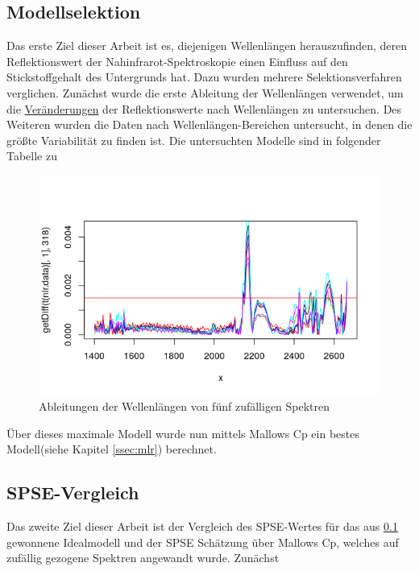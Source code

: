 	\subsection{Modellselektion}
	\label{ssec:modellselektion}
	Das erste Ziel dieser Arbeit ist es, diejenigen Wellenlängen herauszufinden, deren Reflektionswert der Nahinfrarot-Spektroskopie einen Einfluss auf den Stickstoffgehalt des Untergrunds hat. Dazu wurden mehrere Selektionsverfahren verglichen. Zunächst wurde die erste Ableitung der Wellenlängen verwendet, um die \underline{Veränderungen} der Reflektionswerte nach Wellenlängen zu untersuchen. Des Weiteren wurden die Daten nach Wellenlängen-Bereichen untersucht, in denen die größte Variabilität zu finden ist. Die untersuchten Modelle sind in folgender Tabelle zu 
	\begin{table}
		
	\end{table}
	
	
	\begin{figure}
		\label{Wellenlängen_erste_Ableitung}
		\includegraphics[width=\textwidth]{img/wave_1dev.png}
		\caption{Ableitungen der Wellenlängen von fünf zufälligen Spektren}
	\end{figure}
	Über dieses maximale Modell wurde nun mittels Mallows Cp ein bestes Modell(siehe Kapitel \ref{ssec:mlr}) berechnet.
	
	\subsection{SPSE-Vergleich}
	Das zweite Ziel dieser Arbeit ist der Vergleich des SPSE-Wertes für das aus \ref{ssec:modellselektion} gewonnene Idealmodell und der SPSE Schätzung über Mallows Cp, welches auf zufällig gezogene Spektren angewandt wurde. 
	Zunächst 

	
	
	
		
		

